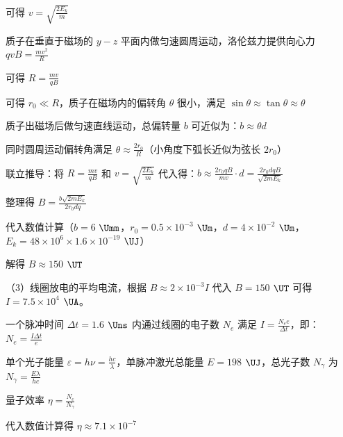 \documentclass[\gkver]{gaokaozhenti}
\begin{document}
\begin{enumerate}
{可得 $v=\sqrt{\frac{2E_{k}}{m}}$

质子在垂直于磁场的 $y-z$ 平面内做匀速圆周运动，洛伦兹力提供向心力 $qvB=\frac{mv^{2}}{R}$

可得 $R=\frac{mv}{qB}$

可得 $r_{0}\ll R$，质子在磁场内的偏转角 $\theta$ 很小，满足 $\sin\theta\approx\tan\theta\approx\theta$

质子出磁场后做匀速直线运动，总偏转量 $b$ 可近似为：$b\approx\theta d$

同时圆周运动偏转角满足 $\theta\approx\frac{2r_{0}}{R}$（小角度下弧长近似为弦长 $2r_{0}$）

联立推导：将 $R=\frac{mv}{qB}$ 和 $v=\sqrt{\frac{2E_{k}}{m}}$ 代入得：$b\approx\frac{2r_{0}qB}{mv}\cdot d=\frac{2r_{0}dqB}{\sqrt{2mE_{k}}}$

整理得 $B=\frac{b\sqrt{2mE_{k}}}{2r_{0}dq}$

代入数值计算（$b=6$ $\Umm$，$r_{0}=0.5\times10^{-3}$ $\Um$，$d=4\times10^{-2}$ $\Um$，$E_{k}=48\times10^{6}\times1.6\times10^{-19}$ $\UJ$）

解得 $B\approx150$ $\UT$

（3）线圈放电的平均电流，根据 $B\approx2\times10^{-3}I$ 代入 $B=150$ $\UT$ 可得 $I=7.5\times10^{4}$ $\UA$。

一个脉冲时间 $\Delta t=1.6$ $\Uns$ 内通过线圈的电子数 $N_{e}$ 满足 $I=\frac{N_{e}e}{\Delta t}$，即：$N_{e}=\frac{I\Delta t}{e}$

单个光子能量 $\varepsilon=h\nu=\frac{hc}{\lambda}$，单脉冲激光总能量 $E=198$ $\UJ$，总光子数 $N_{\gamma}$ 为 $N_{\gamma}=\frac{E\lambda}{hc}$

量子效率 $\eta=\frac{N_{e}}{N_{\gamma}}$

代入数值计算得 $\eta\approx7.1\times10^{-7}$
}


\end{enumerate}
\end{document}
